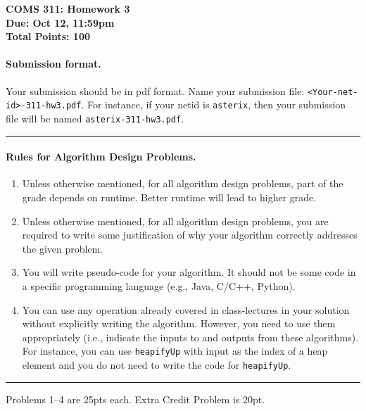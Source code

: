 \documentclass[11pt]{article}
\date{}
\begin{document}
\begin{center}
  \textbf{COMS 311: Homework 3}\\
  \textbf{Due: Oct 12, 11:59pm}\\
  \textbf{Total Points: 100}
  \end{center}

\paragraph{Submission format.\ }
Your submission should be in pdf format.  Name your submission file:
\texttt{<Your-net-id>-311-hw3.pdf}. For instance, if your netid is
\texttt{asterix}, then your submission file will be named
\texttt{asterix-311-hw3.pdf}.

\hrule
\paragraph{Rules for Algorithm Design Problems.\ }
\begin{enumerate}
\item Unless otherwise mentioned, for all algorithm design problems,
  part of the grade depends on runtime. Better runtime will lead to
  higher grade.
\item Unless otherwise mentioned, for all algorithm design problems,
  you are required to write some justification of why your algorithm
  correctly addresses the given problem.
\item You will write pseudo-code for your algorithm. It should not be
  some code in a specific programming language (e.g., Java, C/C++,
  Python).
\item You can use any operation already covered in class-lectures in
  your solution without explicitly writing the algorithm. However, you
  need to use them appropriately (i.e., indicate the inputs to and
  outputs from these algorithms). For instance, you can use
  \texttt{heapifyUp} with input as the index of a heap element and you
  do not need to write the code for \texttt{heapifyUp}. 
\end{enumerate}

\hrule

\medskip

Problems 1--4 are 25pts each. Extra Credit Problem is 20pt. 


\newpage
\end{document}
